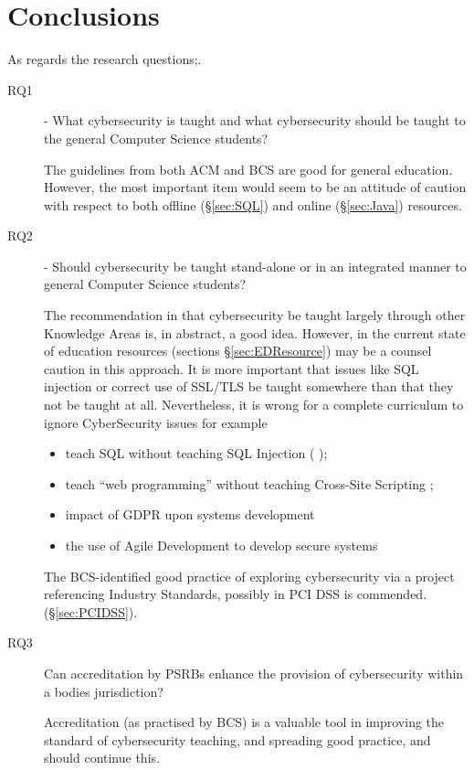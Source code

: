 \documentclass[conference]{IEEEtran}
\begin{document}
\section{Conclusions}
As regards the research questions;.
\begin{description}
\item[RQ1] - What cybersecurity is taught and what cybersecurity should be taught to the general Computer Science students?

The guidelines from both ACM and BCS are good for general education. However, the most important item would seem to be an attitude of caution with respect to both offline (\S\ref{sec:SQL}) and online (\S\ref{sec:Java}) resources. 
\item[RQ2] - Should cybersecurity be taught stand-alone or in an integrated manner to general Computer Science students?

The recommendation in \cite[p. 98]{ACM2013a} that cybersecurity be taught largely through other Knowledge Areas is, in abstract, a good idea.  However, in the current state of education resources (sections \S\ref{sec:EDResource})  may be a counsel caution in this approach.  It is more important that issues like SQL injection \cite{Drop2019} or correct use of SSL/TLS \cite{Chenetal2019a} be taught somewhere than that they not be taught at all.
Nevertheless, it is wrong for a complete curriculum to ignore CyberSecurity issues for example
\begin{itemize}
	\item teach SQL without teaching SQL Injection (\cite{Drop2019} );
	\item teach ``web programming'' without teaching Cross-Site Scripting \cite[(XSS)]{OWASP2017a};
	\item impact of GDPR upon systems development
	\item the use of Agile Development to develop secure systems
\end{itemize}
\par
The BCS-identified good practice of exploring cybersecurity via a project referencing Industry Standards, possibly in PCI DSS is commended.(\S\ref{sec:PCIDSS}).
\item[RQ3] Can accreditation by PSRBs enhance the provision of cybersecurity within a bodies jurisdiction?

Accreditation (as practised by BCS) is a valuable tool in improving the standard of cybersecurity teaching, and spreading good practice, and should continue this. 
\end{description}
\end{document}
